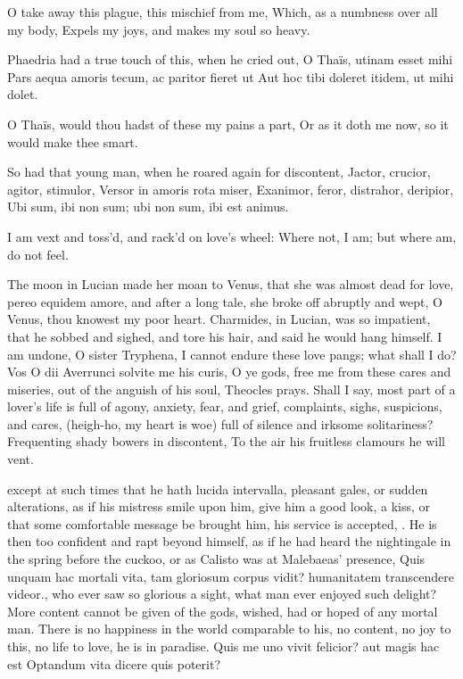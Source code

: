 {O take away this plague, this mischief from me,
Which, as a numbness over all my body,
Expels my joys, and makes my soul so heavy.

Phaedria had a true touch of this, when he cried out,
O Thaïs, utinam esset mihi
Pars aequa amoris tecum, ac paritor fieret ut
Aut hoc tibi doleret itidem, ut mihi dolet.

O Thaïs, would thou hadst of these my pains a part,
Or as it doth me now, so it would make thee smart.

So had that young man, when he roared again for discontent,
Jactor, crucior, agitor, stimulor,
Versor in amoris rota miser,
Exanimor, feror, distrahor, deripior,
Ubi sum, ibi non sum; ubi non sum, ibi est animus.

I am vext and toss'd, and rack'd on love's wheel:
Where not, I am; but where am, do not feel.

The moon in Lucian made her moan to Venus, that she was almost
dead for love, pereo equidem amore, and after a long tale, she broke
off abruptly and wept, O Venus, thou knowest my poor heart.
Charmides, in Lucian, was so impatient, that he sobbed and
sighed, and tore his hair, and said he would hang himself. I am undone,
O sister Tryphena, I cannot endure these love pangs; what shall I do?
Vos O dii Averrunci solvite me his curis, O ye gods, free me from these
cares and miseries, out of the anguish of his soul, Theocles
prays. Shall I say, most part of a lover's life is full of agony,
anxiety, fear, and grief, complaints, sighs, suspicions, and cares,
(heigh-ho, my heart is woe) full of silence and irksome solitariness?
Frequenting shady bowers in discontent,
To the air his fruitless clamours he will vent.

except at such times that he hath lucida intervalla, pleasant gales, or
sudden alterations, as if his mistress smile upon him, give him a good
look, a kiss, or that some comfortable message be brought him, his
service is accepted, \etc{}.
He is then too confident and rapt beyond himself, as if he had heard
the nightingale in the spring before the cuckoo, or as Calisto
was at Malebaeas' presence, Quis unquam hac mortali vita, tam gloriosum
corpus vidit? humanitatem transcendere videor., \etc{} who ever saw so
glorious a sight, what man ever enjoyed such delight? More content
cannot be given of the gods, wished, had or hoped of any mortal man.
There is no happiness in the world comparable to his, no content, no
joy to this, no life to love, he is in paradise.
Quis me uno vivit felicior? aut magis hac est
Optandum vita dicere quis poterit?

}
